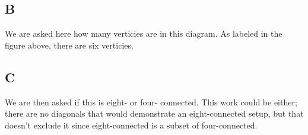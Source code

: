 \documentclass{article}
\begin{document}
\subsection*{B}

We are asked here how many verticies are in this diagram. As labeled in the figure above, there are six verticies.

\subsection*{C}

We are then asked if this is eight- or four- connected. This work could be either; there are no diagonals that would demonstrate an eight-connected setup, but that doesn't exclude it since eight-connected is a subset of four-connected.
\end{document}
